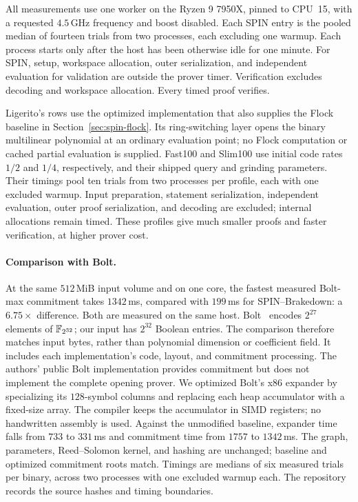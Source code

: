All measurements use one worker on the Ryzen 9 7950X, pinned to CPU~15,
with a requested $4.5$\,GHz frequency and boost disabled. Each SPIN entry is
the pooled median of fourteen trials from two processes, each excluding one
warmup. Each process starts only after the host has been otherwise idle for
one minute. For SPIN, setup, workspace allocation, outer serialization, and independent
evaluation for validation are outside the prover timer. Verification
excludes decoding and workspace allocation. Every timed proof verifies.

Ligerito's rows use the optimized implementation that also supplies the
Flock baseline in Section~\ref{sec:spin-flock}. Its ring-switching layer
opens the binary multilinear polynomial at an ordinary evaluation point;
no Flock computation or cached partial evaluation is supplied. Fast100
and Slim100 use initial code rates $1/2$ and $1/4$, respectively, and
their shipped query and grinding parameters. Their timings pool ten trials
from two processes per profile, each with one excluded warmup. Input
preparation, statement serialization, independent evaluation, outer proof
serialization, and decoding are excluded; internal allocations remain
timed. These profiles give much smaller proofs and faster verification,
at higher prover cost.

\paragraph{Comparison with Bolt.}
\label{app:bolt-estimate}
At the same $512$\,MiB input volume and on one core, the fastest measured
Bolt-max commitment takes $1342$\,ms, compared with $199$\,ms for
SPIN--Brakedown: a $6.75\times$ difference. Both are measured on the
same host. Bolt~\cite{bolt26} encodes
$2^{27}$ elements of $\mathbb F_{2^{32}}$; our input has $2^{32}$ Boolean entries.
The comparison therefore matches input bytes, rather than polynomial
dimension or coefficient field. It includes each implementation's code,
layout, and commitment processing. The authors' public Bolt implementation
provides commitment but does not implement the complete opening prover.
We optimized Bolt's x86 expander by specializing its $128$-symbol columns
and replacing each heap accumulator with a fixed-size array.
The compiler keeps the accumulator in SIMD registers; no handwritten
assembly is used. Against the unmodified baseline, expander time falls
from $733$ to $331$\,ms and commitment time from $1757$ to $1342$\,ms.
The graph, parameters, Reed--Solomon kernel, and hashing are unchanged;
baseline and optimized commitment roots match. Timings are medians of
six measured trials per binary, across two processes with one excluded
warmup each. The repository records the source hashes and timing
boundaries\repositorycite.

